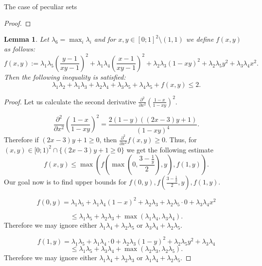 \documentclass[12pt]{article}
\newtheorem{lemma}{Lemma}[section]
\begin{document}
\begin{section}{The case of peculiar sets}
\begin{proof}
    \end{proof}

    \begin{lemma}
    \label{lemma7.3}
    Let $\lambda_{6} = \max_{i}\lambda_{i}$ and for $x,y \in [0;1]^{2}\setminus(1,1)$ we define $f(x,y)$ as follows:
        $$
            f(x,y) := \lambda_{1}\lambda_{5}\left(\frac{y-1}{xy-1}\right)^2 + \lambda_{1}\lambda_{4} \left(\frac{x-1}{xy-1}\right)^2 + \lambda_{2}\lambda_{3}(1-xy)^2 + \lambda_{2}\lambda_{5}y^{2} + \lambda_{3}\lambda_{4}x^{2} .
        $$
        Then the following inequality is satisfied:
        $$
            \lambda_{1}\lambda_{2} + \lambda_{1}\lambda_{3} +  \lambda_{2}\lambda_{4} + \lambda_{3}\lambda_{5} + \lambda_{4}\lambda_{5} + f(x,y) \leq 2. 
        $$
    \end{lemma}

    \begin{proof}
              Let us calculate the second derivative $\frac{\partial^{2}}{\partial x^2}\left(\frac{1-x}{1-xy}\right)^2$. 

        $$
            \frac{\partial^{2}}{\partial x^2}\left(\frac{1-x}{1-xy}\right)^2 = \frac{2(1-y)((2x-3)y + 1)}{(1-xy)^4}.
        $$
        Therefore if $(2x-3)y+1\geq 0$, then $\frac{\partial^{2}}{\partial x^2}f(x,y)\geq 0$. Thus, for $(x,y) \in [0;1)^2 \cap \{(2x-3)y + 1\geq 0\}$ we get the following estimate
        $$
            f(x,y)\leq \max \left(f\left(\max\left(0,\frac{3-\frac{1}{y}}{2}\right), y\right), f(1,y)\right).
        $$
        Our goal now is to find upper bounds for $f(0,y),f\left(\frac{3-\frac{1}{y}}{2},y\right),f(1,y).$ 

        $$
            f(0,y) = \lambda_{1}\lambda_{5} + \lambda_{1}\lambda_{4} (1-x)^2 + \lambda_{2}\lambda_{3} + \lambda_{2}\lambda_{5}\cdot 0 + \lambda_{3}\lambda_{4}x^{2} 
        $$

        $$
            \leq \lambda_{1}\lambda_{5}  + \lambda_{2}\lambda_{3} + \max(\lambda_{1}\lambda_{4},\lambda_{3}\lambda_{4}).
        $$
        Therefore we may ignore  either $\lambda_{1}\lambda_{4} + \lambda_{2}\lambda_{5}$ or $\lambda_{3}\lambda_{4} + \lambda_{2}\lambda_{5}$.

        $$
            f(1,y) = \lambda_{1}\lambda_{5} + \lambda_{1}\lambda_{4} \cdot 0 + \lambda_{2}\lambda_{3}(1-y)^2 + \lambda_{2}\lambda_{5}y^{2} + \lambda_{3}\lambda_{4}
        $$
        $$
            \leq \lambda_{1}\lambda_{5} + \lambda_{3}\lambda_{4} + \max (\lambda_{2}\lambda_{3},\lambda_{2}\lambda_{5}). 
        $$
        Therefore we may ignore  either $\lambda_{1}\lambda_{4} + \lambda_{2}\lambda_{3}$ or $\lambda_{1}\lambda_{4} + \lambda_{2}\lambda_{5}$.
        

\end{proof}
\end{section}
\end{document}
